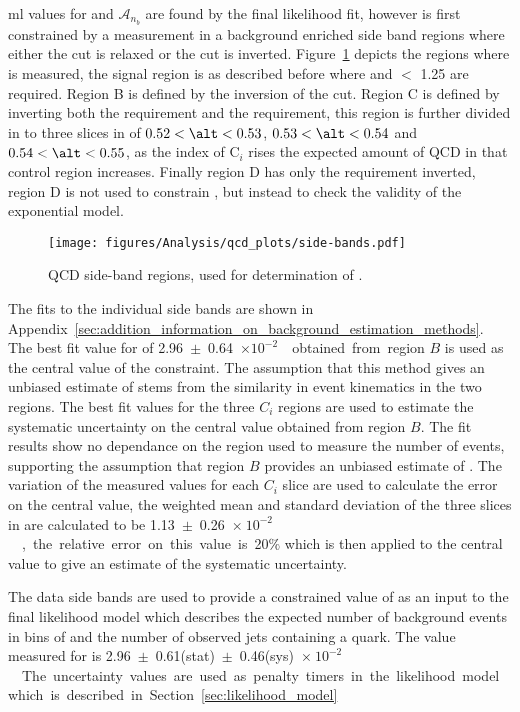 \ac{ml} values for \kqcd and $\mathcal{A}_{n_{b}}$ are found by the final 
likelihood fit, however \kqcd is first constrained by a measurement in a 
background enriched side band regions where either the \alt cut is relaxed or 
the \Rmiss cut is inverted. Figure~\ref{fig:figures_qcd_side-bands} depicts the 
regions where \kqcd is measured, the signal region is as described before where 
\altg and \Rmiss $<$ 1.25 are required. Region B is defined by the inversion of 
the \alt cut. Region C is defined by inverting both the \alt requirement and 
the \Rmiss requirement, this region is further divided in to three slices in 
\alt of $0.52 < \alt < 0.53$, $0.53 < \alt < 0.54$ and $0.54 < \alt < 0.55$, as 
the index of C$_{i}$ rises the expected amount of QCD in that control region 
increases. Finally region D has only the \Rmiss requirement inverted, region D 
is not used to constrain \kqcd, but instead to check the validity of the 
exponential model.
\begin{figure}[ht]
  \centering
    \texttt{[image: figures/Analysis/qcd\_plots/side-bands.pdf]}
  \caption{QCD side-band regions, used for determination of \kqcd.}
  \label{fig:figures_qcd_side-bands}
\end{figure}
The fits to the individual side bands are shown in 
Appendix~\ref{sec:addition_information_on_background_estimation_methods}.
The best fit value for \kqcd of \unit{2.96~$\pm$~0.64~$\times 
10^{-2}$}{\GinveV} obtained from region $B$ is used as the central value of the 
constraint. The assumption that this method gives an unbiased estimate of \kqcd 
stems from the similarity in event kinematics in the two \alt regions.
The best fit values for the three $C_{i}$ regions are used to estimate the 
systematic uncertainty on the central value obtained from region $B$. The fit 
results show no dependance on the \alt region used to measure the number of 
events, supporting the assumption that region $B$ provides an unbiased estimate 
of \kqcd. The variation of the measured values for each $C_{i}$ slice are used 
to calculate the error on the central value, the weighted mean and standard 
deviation of the three slices in \alt are calculated to be 
\unit{1.13~$\pm$~0.26~$\times~10^{-2}$}{\GinveV}, the relative error on this 
value is 20$\%$ which is then applied to the central value to give an estimate 
of the systematic uncertainty.

The data side bands are used to provide a constrained value of \kqcd as an 
input to the final likelihood model which describes the expected number of 
background events in bins of \HT and the number of observed jets containing a 
\Pbottom quark. The value measured for \kqcd is 
\unit{2.96~$\pm$~0.61(stat)~$\pm$~0.46(sys)~$\times~10^{-2}$}{\GinveV}. The 
uncertainty values are used as penalty timers in the likelihood model which is 
described in Section~\ref{sec:likelihood_model}

